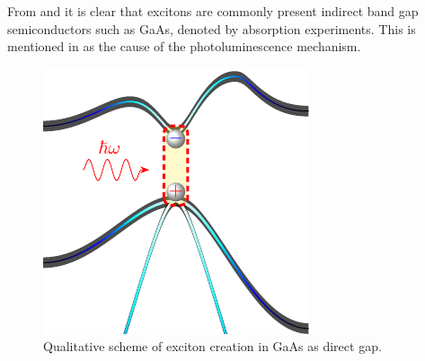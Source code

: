 From  and   it is clear that excitons are commonly present indirect band gap semiconductors such as GaAs, denoted by absorption experiments. This is mentioned in  as the cause of the photoluminescence mechanism.
\begin{figure}[H]
	\centering
	\includegraphics[width=0.5\linewidth]{../figures/chapter-1/exciton-1/build/x-1}
	\caption{Qualitative scheme of exciton creation in GaAs as direct gap.}
	\label{fig:subsubsection-1.1.1-x-1}
\end{figure}

